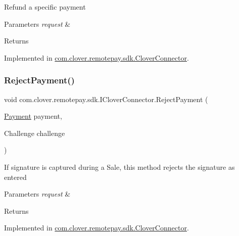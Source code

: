Refund a specific payment 


\begin{DoxyParams}{Parameters}
{\em request} & \\
\hline
\end{DoxyParams}
\begin{DoxyReturn}{Returns}

\end{DoxyReturn}


Implemented in \hyperlink{classcom_1_1clover_1_1remotepay_1_1sdk_1_1_clover_connector_a55f368cbaa89e2a8c47da3ba4a3a80aa}{com.\+clover.\+remotepay.\+sdk.\+Clover\+Connector}.

\mbox{\label{interfacecom_1_1clover_1_1remotepay_1_1sdk_1_1_i_clover_connector_a6f4a1ae115140ff1cbc8b6d4a8f46be5}} 
\subsubsection{\texorpdfstring{Reject\+Payment()}{RejectPayment()}}
{\footnotesize\ttfamily void com.\+clover.\+remotepay.\+sdk.\+I\+Clover\+Connector.\+Reject\+Payment (\begin{DoxyParamCaption}\item[{\hyperlink{classcom_1_1clover_1_1sdk_1_1v3_1_1payments_1_1_payment}{Payment}}]{payment,  }\item[{Challenge}]{challenge }\end{DoxyParamCaption})}



If signature is captured during a Sale, this method rejects the signature as entered 


\begin{DoxyParams}{Parameters}
{\em request} & \\
\hline
\end{DoxyParams}
\begin{DoxyReturn}{Returns}

\end{DoxyReturn}


Implemented in \hyperlink{classcom_1_1clover_1_1remotepay_1_1sdk_1_1_clover_connector_a2ffc66f46fddbf37d780ca269dd3b562}{com.\+clover.\+remotepay.\+sdk.\+Clover\+Connector}.

